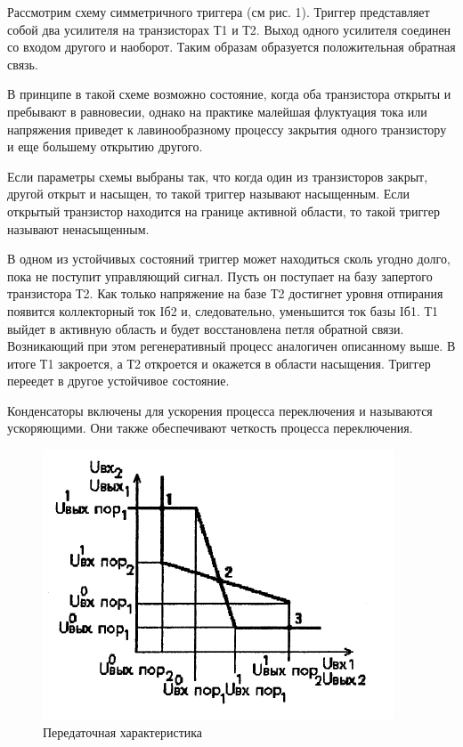 \documentclass[a4paper,14pt]{article}
\begin{document}
Рассмотрим схему симметричного триггера (см рис. 1). Триггер представляет собой
два усилителя на транзисторах Т1 и Т2. Выход одного усилителя соединен со входом
другого и наоборот. Таким образам образуется положительная обратная связь.

В принципе в такой схеме возможно состояние, когда оба транзистора открыты и
пребывают в равновесии, однако на практике малейшая флуктуация тока или напряжения
приведет к лавинообразному процессу закрытия одного транзистору и еще большему
открытию другого.

Если параметры схемы выбраны так, что когда один из транзисторов закрыт, другой
открыт и насыщен, то такой триггер называют насыщенным. Если открытый транзистор
находится на границе активной области, то такой триггер называют ненасыщенным.

В одном из устойчивых состояний триггер может находиться сколь угодно долго,
пока не поступит управляющий сигнал. Пусть он поступает на базу запертого транзистора
Т2. Как только напряжение на базе Т2 достигнет уровня отпирания появится коллекторный
ток Iб2 и, следовательно, уменьшится ток базы Iб1. Т1 выйдет в активную область и будет
восстановлена петля обратной связи. Возникающий при этом регенеративный процесс
аналогичен описанному выше. В итоге Т1 закроется, а Т2 откроется и окажется в области
насыщения. Триггер переедет в другое устойчивое состояние.

Конденсаторы включены для ускорения процесса переключения и называются
ускоряющими. Они также обеспечивают четкость процесса переключения.

\begin{figure}[H]
	\centering
	\includegraphics{image/screenshot002}
	\caption{Передаточная характеристика}
	\label{fig:screenshot002}
\end{figure}
\end{document}
